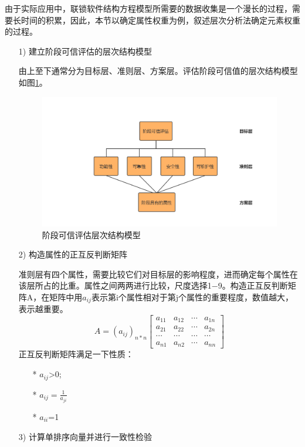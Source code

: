 由于实际应用中，联锁软件结构方程模型所需要的数据收集是一个漫长的过程，需要长时间的积累，因此，本节以确定属性权重为例，叙述层次分析法确定元素权重的过程。

\begin{itemize}
    
\item [1)] 建立阶段可信评估的层次结构模型

由上至下通常分为目标层、准则层、方案层。评估阶段可信值的层次结构模型如图\ref{fig:5_7}。
\begin{figure}[htb]
	\centering
	\includegraphics[width=13cm]{fig/5_12.png}
	\caption{阶段可信评估层次结构模型}
	\label{fig:5_7}
\end{figure}

\item [2)] 构造属性的正互反判断矩阵

准则层有四个属性，需要比较它们对目标层的影响程度，进而确定每个属性在该层所占的比重。属性之间两两进行比较，尺度选择1$-$9。构造正互反判断矩阵A，在矩阵中用$a_{ij}$表示第i个属性相对于第j个属性的重要程度，数值越大，表示越重要。
\[
A=(a_{ij})_{n*n}\begin{bmatrix}
a_{11} & a_{12} & \cdots & a_{1n}\\
a_{21} & a_{22} & \cdots & a_{2n}\\
\cdots & \cdots & \cdots & \cdots\\
a_{n1} & a_{n2} & \cdots & a_{nn}
\end{bmatrix}
\]
正互反判断矩阵满足一下性质：
\begin{itemize}
    \item [*] $a_{ij}$>0;
    \item [*] $a_{ij}=\frac{1}{a_{ji}}$
    \item [*] $a_{ii}$=1
\end{itemize}

\item [3)] 计算单排序向量并进行一致性检验


\end{itemize}

